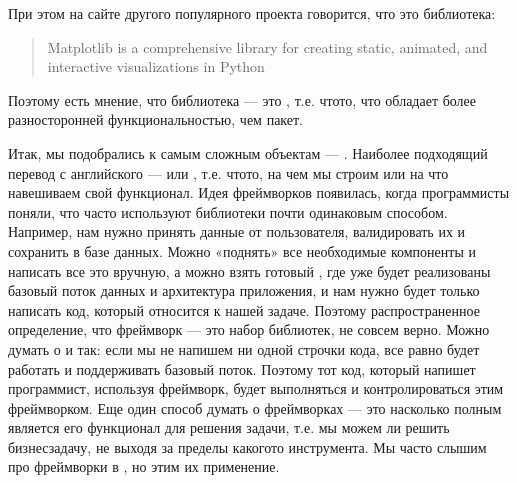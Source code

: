 \documentclass[letterpaper,10pt,russian]{sphinxmanual}
\begin{document}
\sphinxAtStartPar
При этом на сайте другого популярного проекта  говорится, что это библиотека:
\begin{quote}

\sphinxAtStartPar
Matplotlib is a comprehensive library for creating static, animated, and interactive visualizations in Python
\end{quote}

\sphinxAtStartPar
Поэтому есть мнение, что библиотека — это , т.е. что\sphinxhyphen{}то, что обладает более разносторонней функциональностью, чем пакет.

\sphinxAtStartPar
Итак, мы подобрались к самым сложным объектам — . Наиболее подходящий перевод с английского —  или , т.е. что\sphinxhyphen{}то, на чем мы строим или на что навешиваем свой функционал. Идея фреймворков появилась, когда программисты поняли, что часто используют библиотеки почти одинаковым способом. Например, нам нужно принять данные от пользователя, валидировать их и сохранить в базе данных. Можно «поднять» все необходимые компоненты и написать все это вручную, а можно взять готовый , где уже будет реализованы базовый поток данных и архитектура приложения, и нам нужно будет только написать код, который относится к нашей задаче. Поэтому распространенное определение, что фреймворк — это набор библиотек, не совсем верно. Можно думать о   и  так: если мы не напишем ни одной строчки кода,  все равно будет работать и поддерживать базовый поток. Поэтому тот код, который напишет программист, используя фреймворк, будет выполняться и контролироваться этим фреймворком. Еще один способ думать о фреймворках — это насколько полным является его функционал для решения задачи, т.е. мы можем ли решить бизнес\sphinxhyphen{}задачу, не выходя за пределы какого\sphinxhyphen{}то инструмента. Мы часто слышим про фреймворки в , но этим  их применение.
\end{document}
